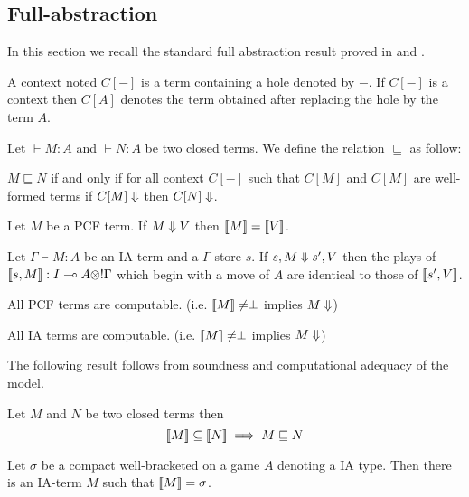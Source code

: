\subsection{Full-abstraction}
In this section we recall the standard full abstraction result proved in  \cite{abramsky94full}
and \cite{hylandong_pcf}.

A context noted $C[-]$ is a term containing a hole denoted by $-$. If $C[-]$ is a context then $C[A]$ denotes the term obtained
after replacing the hole by the term $A$.

\begin{dfn}
Let $\vdash M : A$ and $\vdash N : A$ be two closed terms. We define the relation $\sqsubseteq$ as follow:


$M \sqsubseteq N$ if and only if for all context $C[-]$ such that $C[M]$ and $C[M]$ are well-formed terms if
$C[M] \Downarrow$ then $C[N] \Downarrow$.
\end{dfn}


\begin{lem} Let $M$ be a PCF term.
If $M \Downarrow V$ then ${[\![ M ]\!]} = {[\![ V ]\!]}$.
\end{lem}

\begin{lem} Let $\Gamma \vdash M : A$ be an IA term and a $\Gamma$ store $s$.
If $s,M \Downarrow s',V$ then the plays of ${[\![ s,M ]\!]} : I \multimap A \otimes !\Gamma$ which begin
with a move of $A$ are identical to those of ${[\![ s',V ]\!]}$.
\end{lem}


\begin{lem}
All PCF terms are computable. (i.e. ${[\![ M ]\!]} \neq \perp$ implies $M \Downarrow$)
\end{lem}

\begin{lem}
All IA terms are computable. (i.e. ${[\![ M ]\!]} \neq \perp$ implies $M \Downarrow$)
\end{lem}


The following result follows from soundness and computational adequacy of the model.
\begin{prop}
\label{prop:ineqsoundness}
Let $M$ and $N$ be two closed terms then
$${[\![ M ]\!]} \subseteq {[\![N ]\!]} \implies  M \sqsubseteq N $$
\end{prop}

\begin{prop}[Definability]
\label{prop:definability}
Let $\sigma$ be a compact well-bracketed on a game $A$ denoting a IA type. Then there is
an IA-term $M$ such that ${[\![ M ]\!]} = \sigma$.
\end{prop}

